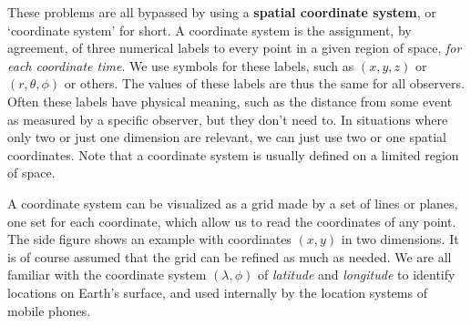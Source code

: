 These problems are all bypassed by using a \textbf{spatial coordinate system}, or \enquote*{coordinate system} for short. A coordinate system is the assignment, by agreement, of three numerical labels to every point in a given region of space, \emph{for each coordinate time}. We use symbols for these labels, such as $(x,y,z)$ or $(r, \theta,\phi)$ or others. The values of these labels are thus the same for all observers. Often these labels have physical meaning, such as the distance from some event as measured by a specific observer, but they don't need to. In situations where only two or just one dimension are relevant, we can just use two or one spatial coordinates. Note that a coordinate system is usually defined on a limited region of space.

%
%
A coordinate system can be visualized as a grid made by a set of lines or planes, one set for each coordinate, which allow us to read the coordinates of any point. The side figure shows an example with coordinates $(x,y)$ in two dimensions. It is of course assumed that the grid can be refined as much as needed. We are all familiar with the coordinate system $(\lambda, \phi)$ of \emph{latitude} and \emph{longitude} to identify locations on Earth's surface, and used internally by the location systems of mobile phones.

